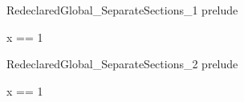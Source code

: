 \begin{zsection}
 \SECTION RedeclaredGlobal\_SeparateSections\_1 \parents prelude
\end{zsection}

\begin{zed}
 x == 1
\end{zed}


\begin{zsection}
 \SECTION RedeclaredGlobal\_SeparateSections\_2 \parents prelude
\end{zsection}

\begin{zed}
  x == 1
\end{zed}

